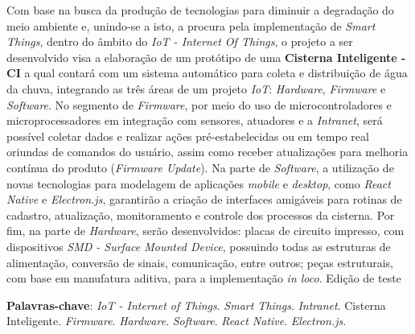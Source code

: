 
\begin{resumo}[RESUMO]
\begin{SingleSpacing}

 Com base na busca da produção de tecnologias para diminuir a degradação do meio ambiente e, unindo-se a isto, a procura pela implementação de \textit{Smart Things}, dentro do âmbito do \textit{IoT - Internet Of Things},  o projeto a ser desenvolvido visa a elaboração de um protótipo de uma \textbf{Cisterna Inteligente - CI} a qual contará com um sistema automático para coleta e distribuição de água da chuva, integrando as três áreas de um projeto \textit{IoT}: \textit{Hardware}, \textit{Firmware} e \textit{Software}. No segmento de \textit{Firmware}, por meio do uso de microcontroladores e microprocessadores em integração com sensores, atuadores e a \textit{Intranet}, será possível coletar dados e realizar ações pré-estabelecidas ou em tempo real oriundas de comandos do usuário, assim como receber atualizações para melhoria contínua do produto (\textit{Firmware Update}).  Na parte de \textit{Software}, a utilização de novas tecnologias para modelagem de aplicações \textit{mobile} e \textit{desktop}, como  \textit{React Native} e \textit{Electron.js},  garantirão a criação de interfaces amigáveis para rotinas de cadastro, atualização, monitoramento e controle dos processos da cisterna. Por fim, na parte de \textit{Hardware}, serão desenvolvidos: placas de circuito impresso, com dispositivos \textit{SMD - Surface Mounted Device}, possuindo todas as estruturas de alimentação, conversão de sinais, comunicação, entre outros; peças estruturais, com base em manufatura aditiva, para a implementação \textit{in loco}.   Edição de teste
 
\vspace{\onelineskip}

\textbf{Palavras-chave}: \textit{IoT - Internet of Things}. \textit{Smart Things}. \textit{Intranet}.  Cisterna Inteligente. \textit{Firmware}. \textit{Hardware}. \textit{Software}. \textit{React Native}. \textit{Electron.js}.

\end{SingleSpacing}
\end{resumo}


